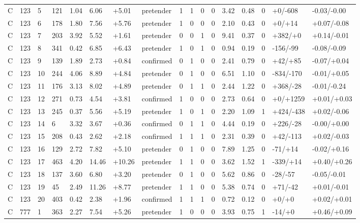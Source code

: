 \documentclass[11pt,a4paper]{article}
\begin{document}
{\begin{longtable}[]{@{}lllllllllllllllll@{}}
C & 123 & 5 & 121 & 1.04 & 6.06 & +5.01 & pretender & 1 & 1 & 0 & 0 & 3.42 & 0.48 & 0 & +0/-608 & -0.03/-0.00 \\
C & 123 & 6 & 178 & 1.80 & 7.56 & +5.76 & pretender & 1 & 0 & 0 & 0 & 2.10 & 0.43 & 0 & +0/+14 & +0.07/-0.08 \\
C & 123 & 7 & 203 & 3.92 & 5.52 & +1.61 & pretender & 0 & 0 & 1 & 0 & 9.41 & 0.37 & 0 & +382/+0 & +0.14/-0.01 \\
C & 123 & 8 & 341 & 0.42 & 6.85 & +6.43 & pretender & 1 & 0 & 1 & 0 & 0.94 & 0.19 & 0 & -156/-99 & -0.08/-0.09 \\
C & 123 & 9 & 139 & 1.89 & 2.73 & +0.84 & confirmed & 0 & 1 & 0 & 0 & 2.41 & 0.79 & 0 & +42/+85 & -0.07/+0.04 \\
C & 123 & 10 & 244 & 4.06 & 8.89 & +4.84 & pretender & 0 & 1 & 0 & 0 & 6.51 & 1.10 & 0 & -834/-170 & -0.01/+0.05 \\
C & 123 & 11 & 176 & 3.13 & 8.02 & +4.89 & pretender & 0 & 1 & 1 & 0 & 2.44 & 1.22 & 0 & +368/-28 & -0.01/-0.24 \\
C & 123 & 12 & 271 & 0.73 & 4.54 & +3.81 & confirmed & 1 & 0 & 0 & 0 & 2.73 & 0.64 & 0 & +0/+1259 & +0.01/+0.03 \\
C & 123 & 13 & 245 & 0.37 & 5.56 & +5.19 & pretender & 1 & 0 & 1 & 0 & 2.20 & 1.09 & 1 & +424/-438 & +0.02/-0.06 \\
C & 123 & 14 & 6 & 3.32 & 3.67 & +0.36 & confirmed & 0 & 1 & 1 & 0 & 4.44 & 0.19 & 0 & +226/-28 & -0.00/+0.00 \\
C & 123 & 15 & 208 & 0.43 & 2.62 & +2.18 & confirmed & 1 & 1 & 1 & 0 & 2.31 & 0.39 & 0 & +42/-113 & +0.02/-0.03 \\
C & 123 & 16 & 129 & 2.72 & 7.82 & +5.10 & pretender & 0 & 1 & 0 & 0 & 7.89 & 1.25 & 0 & -71/+14 & -0.02/+0.16 \\
C & 123 & 17 & 463 & 4.20 & 14.46 & +10.26 & pretender & 1 & 1 & 0 & 0 & 3.62 & 1.52 & 1 & -339/+14 & +0.40/+0.26 \\
C & 123 & 18 & 137 & 3.60 & 6.80 & +3.20 & pretender & 0 & 1 & 0 & 0 & 5.62 & 0.86 & 0 & -28/-57 & -0.05/-0.01 \\
C & 123 & 19 & 45 & 2.49 & 11.26 & +8.77 & pretender & 1 & 1 & 0 & 0 & 5.38 & 0.74 & 0 & +71/-42 & +0.01/-0.01 \\
C & 123 & 20 & 403 & 0.42 & 2.38 & +1.96 & confirmed & 1 & 1 & 1 & 0 & 0.72 & 0.12 & 0 & +0/+0 & +0.02/+0.01 \\
C & 777 & 1 & 363 & 2.27 & 7.54 & +5.26 & pretender & 1 & 0 & 0 & 0 & 3.93 & 0.75 & 1 & -14/+0 & +0.46/+0.09 \\

\end{longtable}}
\end{document}
